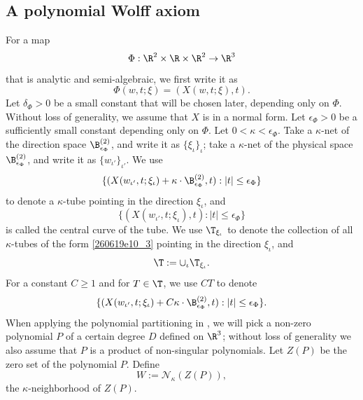 \documentclass{article}
\numberwithin{equation}{section}
\theoremstyle{plain}
\begin{document}
\subsection{A polynomial Wolff axiom}
For a map 
\begin{equation}
\Phi: \R^2\times \R\times \R^2\to \R^3
\end{equation}
that is analytic and semi-algebraic, we first write it as 
\begin{equation}
\Phi(w, t; \xi)= (X(w, t; \xi), t).
\end{equation}
Let $\delta_{\Phi}>0$ be a small constant that will be chosen later, depending only on $\Phi$.
Without loss of generality, we assume that $X$ is in a normal form. 
Let $\epsilon_{\Phi}>0$ be a sufficiently small constant depending only on $\Phi$. Let $0< \kappa< \epsilon_{\Phi}$. Take a $\kappa$-net of the direction space $\B^{(2)}_{\epsilon_{\Phi}}$, and write it as $\{\xi_{\iota}\}_{\iota}$; take a $\kappa$-net of the physical space $\B^{(2)}_{\epsilon_{\Phi}}$, and write it as $\{w_{\iota'}\}_{\iota'}$. We use 
\begin{equation}\label{260619e10_3}
\{
(X(w_{\iota'}, t; \xi_{\iota})+
\kappa\cdot \B^{(2)}_{\epsilon_{\Phi}}
, t): |t|\le \epsilon_{\Phi}
\}
\end{equation}
to denote a $\kappa$-tube pointing in the direction $\xi_{\iota}$, and 
\begin{equation}
\{(X(w_{\iota'}, t; \xi_{\iota}), t): |t|\le \epsilon_{\Phi}\}
\end{equation}
is called the central curve of the tube.  We use $\T_{\xi_{\iota}}$ to denote the collection of all $\kappa$-tubes of the form \eqref{260619e10_3} pointing in the direction $\xi_{\iota}$, and 
\begin{equation}
\T:=\cup_{\iota} \T_{\xi_{\iota}}.
\end{equation}
For a constant $C\ge 1$ and for $T\in \T$, we use $C T$ to denote 
\begin{equation}
\{
(X(w_{\iota'}, t; \xi_{\iota})+
C \kappa\cdot \B^{(2)}_{\epsilon_{\Phi}}
, t): |t|\le \epsilon_{\Phi}
\}.
\end{equation}
When applying the polynomial partitioning in \cite{guth2016restriction}, we will pick a non-zero polynomial $P$ of a certain degree $D$ defined on $\R^3$; without loss of generality we also assume that $P$ is a product of non-singular polynomials.  Let $Z(P)$ be the zero set of the polynomial $P$. Define 
\begin{equation}
W:= \mathcal{N}_{\kappa} (Z(P)),
\end{equation}
the $\kappa$-neighborhood of $Z(P)$. 
\end{document}

